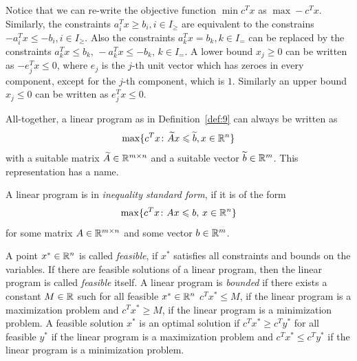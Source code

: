   Notice that we can re-write the objective function $\min c^Tx$ as
  $\max -c^Tx $. Similarly, the  constraints
  $a_i^T x \geq b_i, i \in {I_\geq} $ are equivalent to the constrains 
  $-a_i^T x \leq -b_i, i \in {I_\geq}$. Also the constraints  $ a_k^T x =
  b_k, k \in {I_=}$ can be replaced by the constraints  $a_k^T x \leq
  b_k,\, -a_k^T x \leq  -b_k,\,   k \in {I_=}$. 
  A  lower bound $x_j \geq0$ can be written as $-e_j^Tx\leq0$, where $e_j$ is
  the $j$-th unit vector which has zeroes in every component, except
  for the $j$-th component, which is $1$. Similarly an upper bound
  $x_j\leq0$ can be written as $e_j^Tx\leq0$. 

  All-together, a linear program as in Definition~\ref{def:9}  can
  always be written as 
  $$\max\{c^Tx\colon \widetilde{A}x\leqslant \widetilde{b}, x\in \mathbb{R}^n\}$$ with a suitable matrix
  $\widetilde{A} \in \mathbb{R}^{m\times n}$ and a   suitable vector $\widetilde{b}\in \mathbb{R}^m$. This
  representation has a name. 



\begin{definition}
  \label{def:11}
  A linear program is in \emph{inequality standard form}, if it is of
  the form
  \begin{displaymath}
    \max \{c^Tx \colon Ax\leqslant b, \, x \in \mathbb{R}^n\}
  \end{displaymath}
  for some matrix $A\in \mathbb{R}^{m\times n}$ and some vector $b \in \mathbb{R}^m$. 
\end{definition}

\begin{definition}
\label{def:10}
A point $x^* \in \mathbb{R}^n$ is called \emph{feasible}, if $x^*$
satisfies all constraints and bounds on the variables. If there are
feasible solutions of a linear program, then the linear program is
called \emph{feasible} itself. A linear program is \emph{bounded} if
there exists a constant $M \in \mathbb{R}$ such for all feasible $x^* \in
\mathbb{R}^n$ $c^Tx^* \leq M$, if the linear program is a maximization
problem and $c^Tx^*\geq M$, if the linear program is a minimization
problem.  A feasible solution $x^*$ is an optimal solution if
$c^Tx^*\geq c^Ty^*$ for all feasible $y^*$ if the linear program is a
maximization problem and $c^Tx^* \leq c^Ty^*$ if the linear program is
a minimization problem.
\end{definition}


